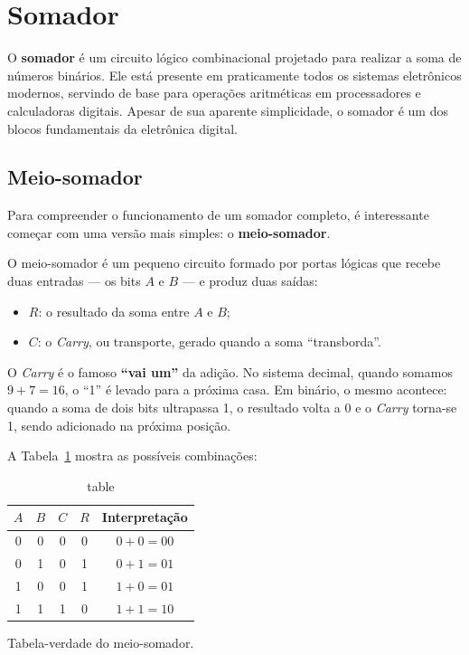 \documentclass[12pt]{article}
\begin{document}
\section{Somador}

O \textbf{somador} é um circuito lógico combinacional projetado para realizar a soma de números binários.  
Ele está presente em praticamente todos os sistemas eletrônicos modernos, servindo de base para operações aritméticas em processadores e calculadoras digitais.  
Apesar de sua aparente simplicidade, o somador é um dos blocos fundamentais da eletrônica digital.

\subsection{Meio-somador}

Para compreender o funcionamento de um somador completo, é interessante começar com uma versão mais simples: o \textbf{meio-somador}.

O meio-somador é um pequeno circuito formado por portas lógicas que recebe duas entradas — os bits \(A\) e \(B\) — e produz duas saídas:
\begin{itemize}
    \item \(R\): o resultado da soma entre \(A\) e \(B\);
    \item \(C\): o \textit{Carry}, ou transporte, gerado quando a soma “transborda”.
\end{itemize}

\begin{tcolorbox}[mynote, title=\textbf{\textit{Carry}}]
O \textit{Carry} é o famoso \textbf{“vai um”} da adição.  
No sistema decimal, quando somamos $9 + 7 = 16$, o “1” é levado para a próxima casa.  
Em binário, o mesmo acontece: quando a soma de dois bits ultrapassa 1, o resultado volta a 0 e o \textit{Carry} torna-se 1, sendo adicionado na próxima posição.
\end{tcolorbox}

A Tabela~\ref{tab:meio-somador} mostra as possíveis combinações:

\begin{table}[H]
\centering
\begin{tabular}{|c|c|c|c|c|}
\hline
$A$ & $B$ & $C$ & $R$ & Interpretação\\
\hline
0 & 0 & 0 & 0 & $0+0=00$\\
0 & 1 & 0 & 1 & $0+1=01$\\
1 & 0 & 0 & 1 & $1+0=01$\\
1 & 1 & 1 & 0 & $1+1=10$\\
\hline
\end{tabular}
\caption{table}{Tabela-verdade do meio-somador.}
\label{tab:meio-somador}
\end{table}
\end{document}
